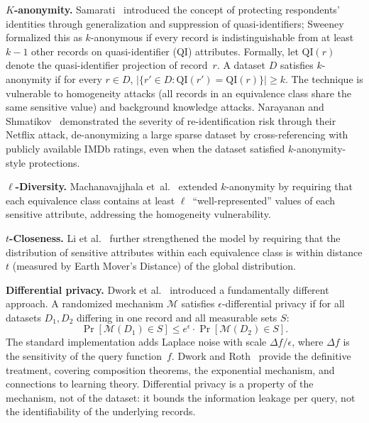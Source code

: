 \documentclass[journal]{IEEEtran}
\begin{document}
\textbf{$K$-anonymity.} Samarati~\cite{samarati2001protecting} introduced the concept of protecting respondents' identities through generalization and suppression of quasi-identifiers; Sweeney~\cite{sweeney2002kanon} formalized this as $k$-anonymous if every record is indistinguishable from at least $k{-}1$ other records on quasi-identifier (QI) attributes. Formally, let $\mathrm{QI}(r)$ denote the quasi-identifier projection of record~$r$. A dataset $D$ satisfies $k$-anonymity if for every $r \in D$, $|\{r' \in D : \mathrm{QI}(r') = \mathrm{QI}(r)\}| \geq k$. The technique is vulnerable to homogeneity attacks (all records in an equivalence class share the same sensitive value) and background knowledge attacks. Narayanan and Shmatikov~\cite{narayanan2008robust} demonstrated the severity of re-identification risk through their Netflix attack, de-anonymizing a large sparse dataset by cross-referencing with publicly available IMDb ratings, even when the dataset satisfied $k$-anonymity-style protections.

\textbf{$\ell$-Diversity.} Machanavajjhala et~al.~\cite{machanavajjhala2007ldiv} extended $k$-anonymity by requiring that each equivalence class contains at least $\ell$~``well-represented'' values of each sensitive attribute, addressing the homogeneity vulnerability.

\textbf{$t$-Closeness.} Li et al.~\cite{li2007tcloseness} further strengthened the model by requiring that the distribution of sensitive attributes within each equivalence class is within distance $t$ (measured by Earth Mover's Distance) of the global distribution.

\textbf{Differential privacy.} Dwork et al.~\cite{dwork2006dp} introduced a fundamentally different approach. A randomized mechanism $\mathcal{M}$ satisfies $\epsilon$-differential privacy if for all datasets $D_1, D_2$ differing in one record and all measurable sets $S$:
\begin{equation}
\Pr[\mathcal{M}(D_1) \in S] \leq e^\epsilon \cdot \Pr[\mathcal{M}(D_2) \in S].
\label{eq:dp}
\end{equation}
The standard implementation adds Laplace noise with scale $\Delta f / \epsilon$, where $\Delta f$ is the sensitivity of the query function~$f$. Dwork and Roth~\cite{dwork2014algfound} provide the definitive treatment, covering composition theorems, the exponential mechanism, and connections to learning theory. Differential privacy is a property of the mechanism, not of the dataset: it bounds the information leakage per query, not the identifiability of the underlying records.
\end{document}
